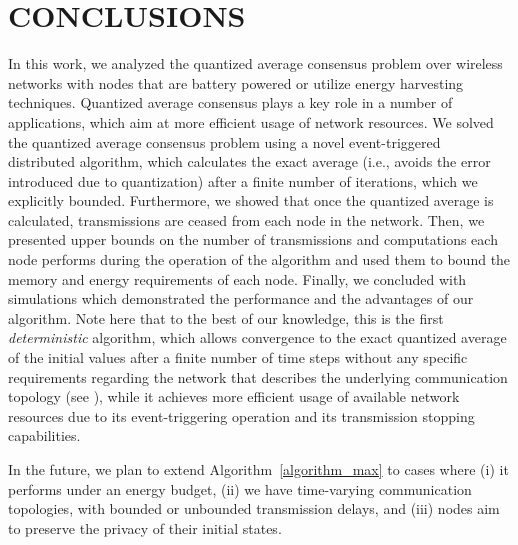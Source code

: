 \documentclass[twocolumn]{autart}    %
\newtheorem{remark}{Remark}
\begin{document}


\section{CONCLUSIONS}\label{future}

In this work, we analyzed the quantized average consensus problem over wireless networks with nodes that are battery powered or utilize energy harvesting techniques. 
Quantized average consensus plays a key role in a number of applications, which aim at more efficient usage of network resources. 
We solved the quantized average consensus problem using a novel event-triggered distributed algorithm, which calculates the exact average (i.e., avoids the error introduced due to quantization) after a finite number of iterations, which we explicitly bounded. 
Furthermore, we showed that once the quantized average is calculated, transmissions are ceased from each node in the network. 
Then, we presented upper bounds on the number of transmissions and computations each node performs during the operation of the algorithm and used them to bound the memory and energy requirements of each node. 
Finally, we concluded with simulations which demonstrated the performance and the advantages of our algorithm. 
Note here that to the best of our knowledge, this is the first {\em deterministic} algorithm, which allows convergence to the exact quantized average of the initial values after a finite number of time steps without any specific requirements regarding the network that describes the underlying communication topology (see \cite{2016:Chamie_Basar}), while it achieves more efficient usage of available network resources due to its event-triggering operation and its transmission stopping capabilities.  

In the future, we plan to extend Algorithm~\ref{algorithm_max} to cases where (i) it performs under an energy budget, (ii) we have time-varying communication topologies, with bounded or unbounded transmission delays, and (iii) nodes aim to preserve the privacy of their initial states.  
\end{document}
